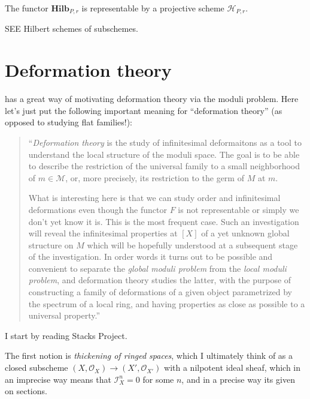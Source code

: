 \documentclass{book}
\begin{document}
\begin{theorem}[Grothendieck, '66]
\label{theorem-Grothendieck}
The functor $\mathbf{Hilb}_{P,r}$ is
representable by a projective scheme
$\mathcal{H}_{P,r}$.
\end{theorem}

SEE Hilbert schemes of subschemes.

\section{Deformation theory}
\label{section-deformation-theory}

\noindent
\cite{Sernesi-Overview} has a great way of
motivating deformation
theory via the moduli problem.
Here let's just put the following important
meaning for
``deformation theory'' (as opposed to
studying flat families!):

\begin{quote}
``{\it Deformation theory} is the study of
infinitesimal deformaitons
as a tool to understand the local structure
of the moduli space.
The goal is to be able to describe the
restriction
of the universal family to a small
neighborhood of $m \in \mathcal{M}$,
or, more precisely, its restriction to the
germ of $M$ at $m$.

What is interesting here is that we can study
order and infinitesimal
deformations even though the functor $F$ is
not representable or simply we don’t
yet know it is. This is the most frequent
case. Such an investigation will
reveal the infinitesimal properties at $[X]$
of a yet unknown global structure
on $M$ which will be hopefully understood at
a subsequent stage of the
investigation.  In order words it turns out
to be possible and convenient to
separate the {\it global moduli problem} from
the {\it local moduli problem},
and deformation theory studies the latter,
with the purpose of constructing a
family of deformations of a given object
parametrized by the spectrum of a local
ring, and having properties as close as
possible to a universal property.''
\end{quote}




\noindent
I start by reading Stacks Project.

\medskip\noindent
The first notion is {\it thickening of ringed
spaces},
which I ultimately think of as a closed
subscheme
$(X,\mathcal{O}_X) \to (X',\mathcal{O}_{X'})$
with a nilpotent ideal sheaf,
which in an imprecise way means
that $\mathcal{I}_X^n=0$ for some $n$,
and in a precise way its given on sections.
\end{document}
